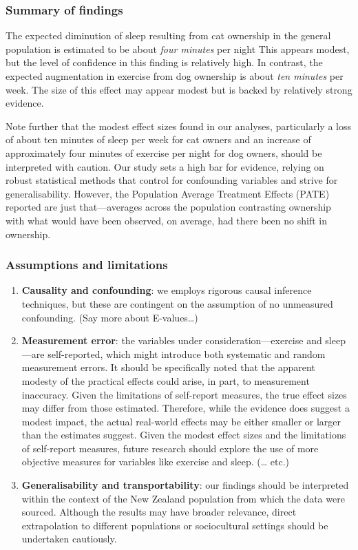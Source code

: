 \documentclass[
  singlecolumn,
  9pt]{article}
\begin{document}
\subsubsection{Summary of findings}\label{summary-of-findings}

The expected diminution of sleep resulting from cat ownership in the
general population is estimated to be about \emph{four minutes} per
night This appears modest, but the level of confidence in this finding
is relatively high. In contrast, the expected augmentation in exercise
from dog ownership is about \emph{ten minutes} per week. The size of
this effect may appear modest but is backed by relatively strong
evidence.

Note further that the modest effect sizes found in our analyses,
particularly a loss of about ten minutes of sleep per week for cat
owners and an increase of approximately four minutes of exercise per
night for dog owners, should be interpreted with caution. Our study sets
a high bar for evidence, relying on robust statistical methods that
control for confounding variables and strive for generalisability.
However, the Population Average Treatment Effects (PATE) reported are
just that---averages across the population contrasting ownership with
what would have been observed, on average, had there been no shift in
ownership.

\subsubsection{Assumptions and
limitations}\label{assumptions-and-limitations}

\begin{enumerate}
\def\labelenumi{\arabic{enumi}.}
\item
  \textbf{Causality and confounding}: we employs rigorous causal
  inference techniques, but these are contingent on the assumption of no
  unmeasured confounding. (Say more about E-values\ldots)
\item
  \textbf{Measurement error}: the variables under
  consideration---exercise and sleep---are self-reported, which might
  introduce both systematic and random measurement errors. It should be
  specifically noted that the apparent modesty of the practical effects
  could arise, in part, to measurement inaccuracy. Given the limitations
  of self-report measures, the true effect sizes may differ from those
  estimated. Therefore, while the evidence does suggest a modest impact,
  the actual real-world effects may be either smaller or larger than the
  estimates suggest. Given the modest effect sizes and the limitations
  of self-report measures, future research should explore the use of
  more objective measures for variables like exercise and sleep.
  (\ldots{} etc.)
\item
  \textbf{Generalisability and transportability}: our findings should be
  interpreted within the context of the New Zealand population from
  which the data were sourced. Although the results may have broader
  relevance, direct extrapolation to different populations or
  sociocultural settings should be undertaken cautiously.
\end{enumerate}
\end{document}

